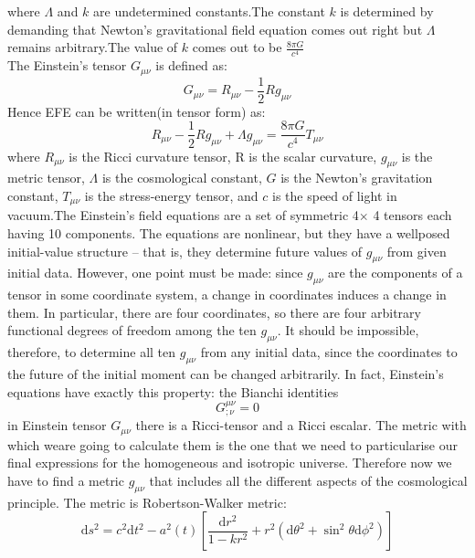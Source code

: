 \documentclass[14pt]{extarticle}
\begin{document}
where $\Lambda$ and $k$ are undetermined constants.The constant $k$ is determined by demanding that Newton's gravitational field equation comes out right but $\Lambda$ remains arbitrary.The value of $k$ comes out to be  $\frac{8 \pi G}{c^{4}}$\\
The Einstein's tensor $G_{\mu \nu}$ is defined as:\\
\begin{equation}
G_{\mu \nu}=R_{\mu \nu}-\frac{1}{2} R g_{\mu \nu}
\end{equation}
Hence EFE can be written(in tensor form) as: \\
\begin{equation}
R_{\mu \nu}-\frac{1}{2} R g_{\mu \nu}+\Lambda g_{\mu \nu}=\frac{8 \pi G}{c^{4}} T_{\mu \nu}
\end{equation}
where $R_{\mu \nu}$ is the Ricci curvature tensor, R is the scalar curvature, $g_{\mu \nu}$ is the metric tensor, $\Lambda$ is the  cosmological constant, $G$ is the Newton's gravitation constant, $T_{\mu \nu}$ is the stress-energy tensor, and $c$ is the speed of light in vacuum.The Einstein's field equations are a set of symmetric 4$\times$ 4 tensors each having 10 components. The equations are nonlinear, but they have a wellposed initial-value structure – that is, they determine future values of $g_{\mu \nu}$ from given initial data. However, one point must be made: since $g_{\mu \nu}$ are the components of a tensor in some coordinate system, a change in coordinates induces a change in them. In particular, there are four coordinates, so there are four arbitrary functional degrees of freedom among the ten $g_{\mu \nu}$. It should be impossible, therefore, to determine all ten $g_{\mu \nu}$ from any initial data, since the coordinates to the future of the initial moment can be changed arbitrarily. In fact, Einstein’s equations have exactly this property: the Bianchi identities\\
\begin{equation}
G_{ ; \nu}^{\mu \nu}=0
\end{equation}
 in  Einstein  tensor $G_{\mu \nu}$  there  is  a  Ricci-tensor  and  a  Ricci  escalar.   The  metric  with  which  weare going to calculate them is the one that we need to particularise  our  final  expressions  for  the  homogeneous and  isotropic  universe.   Therefore  now  we  have  to  find a metric $g_{\mu \nu}$ that includes all the different aspects of the cosmological principle. The metric is Robertson-Walker metric:\\
\begin{equation}
\mathrm{d} s^{2}=c^{2} \mathrm{d} t^{2}-a^{2}(t)\left[\frac{\mathrm{d} r^{2}}{1-k r^{2}}+r^{2}\left(\mathrm{d} \theta^{2}+\sin ^{2} \theta \mathrm{d} \phi^{2}\right)\right]
\end{equation}
\end{document}
